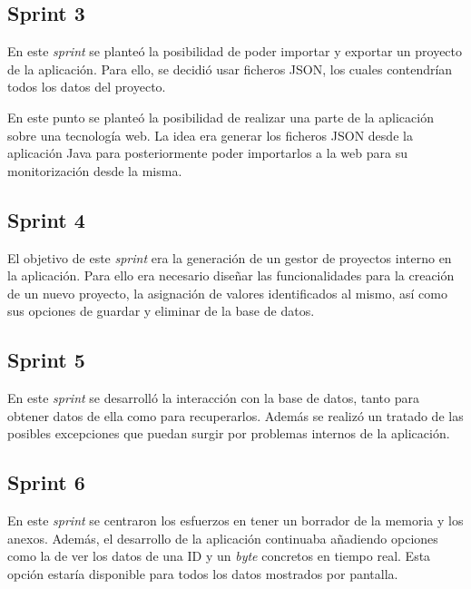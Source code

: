 \subsection{Sprint 3}

En este \emph{sprint} se planteó la posibilidad de poder importar y exportar un proyecto de la aplicación. Para ello, se decidió usar ficheros JSON, los cuales contendrían todos los datos del proyecto.

En este punto se planteó la posibilidad de realizar una parte de la aplicación sobre una tecnología web. La idea era generar los ficheros JSON desde la aplicación Java para posteriormente poder importarlos a la web para su monitorización desde la misma.


\subsection{Sprint 4}

El objetivo de este \emph{sprint} era la generación de un gestor de proyectos interno en la aplicación. Para ello era necesario diseñar las funcionalidades para la creación de un nuevo proyecto, la asignación de valores identificados al mismo, así como sus opciones de guardar y eliminar de la base de datos.


\subsection{Sprint 5}

En este \emph{sprint} se desarrolló la interacción con la base de datos, tanto para obtener datos de ella como para recuperarlos. Además se realizó un tratado de las posibles excepciones que puedan surgir por problemas internos de la aplicación.


\subsection{Sprint 6}

En este \emph{sprint} se centraron los esfuerzos en tener un borrador de la memoria y los anexos. Además, el desarrollo de la aplicación continuaba añadiendo opciones como la de ver los datos de una ID y un \emph{byte} concretos en tiempo real. Esta opción estaría disponible para todos los datos mostrados por pantalla.

